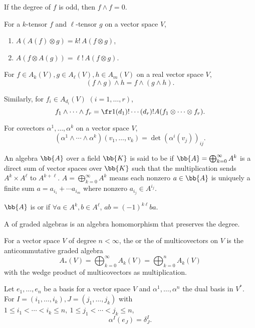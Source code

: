 If the degree of $f$ is odd, then $f \wedge f = 0$.

For a $k$-tensor $f$ and $\ell$-tensor $g$ on a vector space $V$,
\begin{enumerate}
\item $A(A(f)\otimes g) = k!\,A(f\otimes g)$,
\item $A(f\otimes A(g)) = \ell!\,A(f\otimes g)$.
\end{enumerate}

For $f \in A_k(V), g \in A_\ell(V), h \in A_m(V)$ on a real vector space $V$,
\[
(f \wedge g) \wedge h = f \wedge ( g \wedge h).
\]

Similarly, for $f_i \in A_{d_i}(V)$ $(i = 1, \dotsc, r)$,
\[
f_1 \wedge \dotsb \wedge f_r = \fr1{(d_1)!\dotsm (d_r)!} A(f_1 \otimes \dotsm \otimes f_r).
\]

For covectors $\alpha^1, \dotsc , \alpha^k$ on a vector space $V$,
\[
(\alpha^1\wedge \dotsm \wedge \alpha^k)(v_1,\dotsc, v_k) = \det (\alpha^i (v_j))_{ij}.
\]

An algebra $\bb{A}$ over a field $\bb{K}$ is said to be  if $\bb{A} = \bigoplus_{k = 0}^\infty A^k$ is a direct sum of vector spaces over $\bb{K}$ such that the multiplication sends $A^k \times A^\ell$ to $A^{k+\ell}$. $A = \bigoplus_{k = 0}^\infty A^k$ means each nonzero $a \in \bb{A}$ is uniquely a finite sum $a = a_{i_1} + \dotsb a_{i_m}$ where nonzero $a_{i_j} \in A^{i_j}$.

$\bb{A}$ is  or  if $\forall a \in A^k, b \in A^\ell$, $ab = (-1)^{k\ell} ba$.

A  of graded algebras is an algebra homomorphism that preserves the degree.

For a vector space $V$ of degree $n < \infty$, the  or the  of multicovectors on $V$ is the anticommutative graded algebra
\[
A_* (V) = \bigoplus_{k = 0}^\infty A_k(V) = \bigoplus_{k = 0}^n A_k(V)
\]
with the wedge product of multicovectors as multiplication.

Let $e_1, \dotsc, e_n$ be a basis for a vector space $V$ and $\alpha^1, \dotsc, \alpha^n$ the dual basis in $V^*$. For $I = (i_1, \dotsc, i_k), J = (j_1, \dotsc, j_k)$ with $1 \le i_1 < \dotsb < i_k \le n,\ 1 \le j_1 < \dotsb < j_k \le n$,
\[
\alpha^I (e_J) = \delta^I_J.
\]

